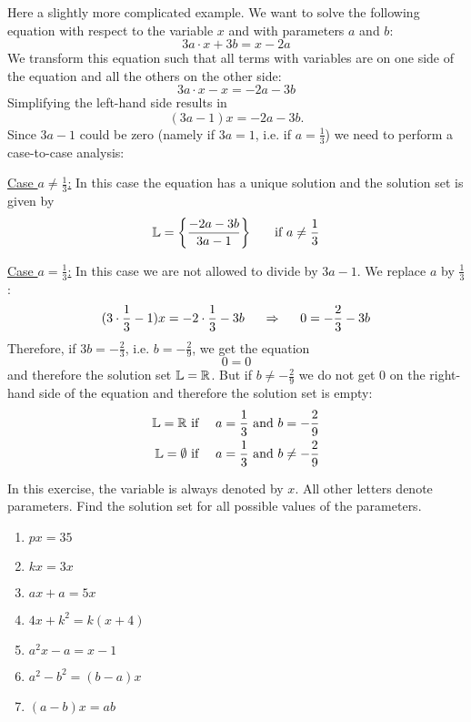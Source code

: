 \newpage
\begin{example}
Here a slightly more complicated example. We want to solve the following equation with respect to the variable $x$ and with parameters $a$ and $b$:
\[
3a\cdot x +3b= x-2a
\]
We transform this equation such that all terms with variables are on one side of the equation and all the others on the other side:
\[
3a\cdot x-x=-2a-3b
\]
Simplifying the left-hand side results in
\[
(3a-1)x=-2a-3b.
\]
Since $3a-1$ could be zero (namely if $3a=1$, i.e. if $a=\frac{1}{3}$) we need to perform a case-to-case analysis:
\vsp

\underline{Case $a\neq\frac{1}{3}$:} In this case the equation has a unique solution and the solution set is given by
\[
\mathbb{L}=\left\{\frac{-2a-3b}{3a-1}\right\} \hspace{5mm}\text{ if $a\neq\frac{1}{3}$}
\]
\vsp

\underline{Case $a=\frac{1}{3}$:} In this case we are not allowed to divide by $3a-1$. We replace $a$ by $\frac{1}{3}$:
\[
(3\cdot \frac{1}{3}-1)x=-2\cdot\frac{1}{3}-3b \hspace{5mm}\Rightarrow\hspace{5mm} 0=-\frac{2}{3}-3b 
\]
Therefore, if $3b=-\frac{2}{3}$, i.e. $b=-\frac{2}{9}$, we get the equation 
\[
0=0
\]
and therefore the solution set $\mathbb{L}=\mathbb{R}$. But if $b\neq -\frac{2}{9}$ we do not get 0 on the right-hand side of the equation and therefore the solution set is empty:
\begin{eqnarray*}
\mathbb{L}=\mathbb{R} &\text{ if }& a=\frac{1}{3} \text{ and } b=-\frac{2}{9}\\
\mathbb{L}=\emptyset &\text{ if }& a=\frac{1}{3} \text{ and } b\neq-\frac{2}{9}
\end{eqnarray*}
\end{example}
\vfill

\newpage
\begin{exer} In this exercise, the variable is always denoted by $x$. All other letters denote parameters. Find the solution set for all possible values of the parameters. 

\begin{enumerate}[label=\emph{\alph*})]

\item $px=35$
\vfill

\item $kx=3x$
\vfill

\item $ax+a=5x$
\vfill

\item $4x+k^2=k(x+4)$
\vfill

\item $a^2x-a=x-1$
\vfill

\item $a^2-b^2=(b-a)x$
\vfill

\item $(a-b)x=ab$
\vfill

\end{enumerate}
\end{exer}

